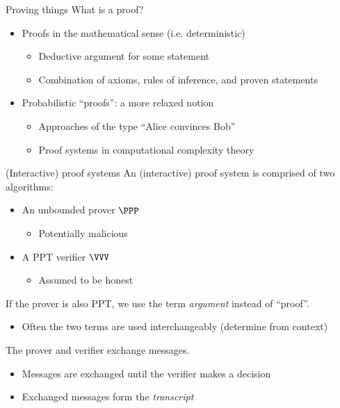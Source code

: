 \begin{frame}{Proving things}
  What is a proof?
  \begin{itemize}[<+(1)->]
    \item Proofs in the mathematical sense (i.e. deterministic)
    \begin{itemize}
      \item Deductive argument for some statement
      \item Combination of axioms, rules of inference, and proven statements
    \end{itemize}
    \item Probabilistic \enquote{proofs}: a more relaxed notion
    \begin{itemize}
      \item Approaches of the type \enquote{Alice convinces Bob}
      \item Proof systems in computational complexity theory
    \end{itemize}
  \end{itemize}
\end{frame}

\begin{frame}{(Interactive) proof systems}
  An (interactive) proof system is comprised of two algorithms:
  \begin{itemize}[<+(1)->]
    \item An unbounded prover $\PPP$
    \begin{itemize}
      \item Potentially malicious
    \end{itemize}
    \item A PPT verifier $\VVV$
    \begin{itemize}
      \item Assumed to be honest
    \end{itemize}
  \end{itemize}

  \vspace*{1em}
  
  \pause
  If the prover is also PPT, we use the term \emph{argument} instead of \enquote{proof}.
  \begin{itemize}[<+(1)->]
    \item Often the two terms are used interchangeably (determine from context)
  \end{itemize}

  \vspace*{1em}

  \pause
  The prover and verifier exchange messages.
  \begin{itemize}[<+(1)->]
    \item Messages are exchanged until the verifier makes a decision
    \item Exchanged messages form the \emph{transcript}
  \end{itemize}
\end{frame}

